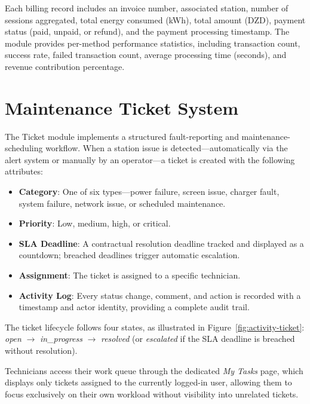 \documentclass[12pt,a4paper]{report}
\begin{document}
Each billing record includes an invoice number, associated station, number of sessions
aggregated, total energy consumed (kWh), total amount (DZD), payment status (paid, unpaid, or
refund), and the payment processing timestamp. The module provides per-method performance
statistics, including transaction count, success rate, failed transaction count, average
processing time (seconds), and revenue contribution percentage.

\section{Maintenance Ticket System}

The Ticket module implements a structured fault-reporting and maintenance-scheduling workflow.
When a station issue is detected---automatically via the alert system or manually by an
operator---a ticket is created with the following attributes:

\begin{itemize}
  \item \textbf{Category}: One of six types---power failure, screen issue, charger fault,
        system failure, network issue, or scheduled maintenance.
  \item \textbf{Priority}: Low, medium, high, or critical.
  \item \textbf{SLA Deadline}: A contractual resolution deadline tracked and displayed as a
        countdown; breached deadlines trigger automatic escalation.
  \item \textbf{Assignment}: The ticket is assigned to a specific technician.
  \item \textbf{Activity Log}: Every status change, comment, and action is recorded with a
        timestamp and actor identity, providing a complete audit trail.
\end{itemize}

The ticket lifecycle follows four states, as illustrated in Figure~\ref{fig:activity-ticket}:
\textit{open} $\rightarrow$ \textit{in\_progress} $\rightarrow$ \textit{resolved}
(or \textit{escalated} if the SLA deadline is breached without resolution).

Technicians access their work queue through the dedicated \textit{My Tasks} page, which
displays only tickets assigned to the currently logged-in user, allowing them to focus
exclusively on their own workload without visibility into unrelated tickets.
\end{document}
